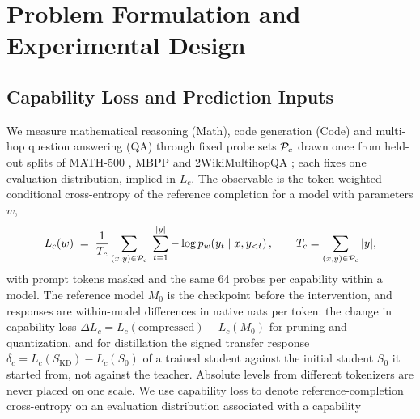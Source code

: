 \section{Problem Formulation and Experimental Design}
\label{sec:setup}

\subsection{Capability Loss and Prediction Inputs}
\label{sec:loss}

We measure mathematical reasoning (Math), code generation (Code) and multi-hop question answering
(QA) through fixed probe sets $\mathcal{P}_{c}$ drawn once from held-out splits of MATH-500
\citep{hendrycks2021math,lightman2023verify}, MBPP \citep{austin2021program} and 2WikiMultihopQA
\citep{ho2020constructing}; each fixes one evaluation distribution, implied in $L_c$. The observable
is the
token-weighted conditional cross-entropy of the reference completion for a model with parameters $w$,
\begin{equation}
L_{c}(w)\;=\;\frac{1}{T_c}\sum_{(x,y)\in\mathcal{P}_{c}}\;\sum_{t=1}^{|y|}
-\log p_w\!\left(y_t\mid x,y_{<t}\right),\qquad
T_c=\sum_{(x,y)\in\mathcal{P}_{c}}|y|,
\label{eq:taskloss}
\end{equation}
with prompt tokens masked and the same 64 probes per capability within a model. The reference model
$M_0$ is the checkpoint before the intervention, and responses are within-model differences in
native nats per token: the change in capability loss $\Delta L_c=L_c(\text{compressed})-L_c(M_0)$ for pruning and
quantization, and for distillation the signed transfer response
$\delta_c=L_c(S_{\mathrm{KD}})-L_c(S_0)$ of a trained student against the initial student $S_0$ it
started from, not against the teacher. Absolute levels from different tokenizers are never placed on one scale. We use capability loss to denote reference-completion cross-entropy on an evaluation distribution associated with a capability


